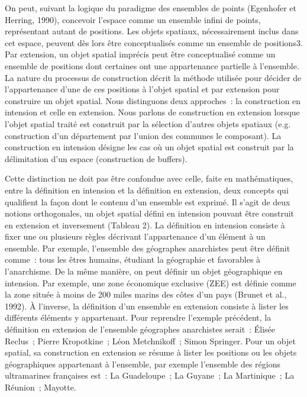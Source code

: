 On peut, suivant la logique du paradigme des ensembles de points
(Egenhofer et Herring, 1990), concevoir l’espace comme un ensemble
infini de points, représentant autant de positions. Les objets
spatiaux, nécessairement inclus dans cet espace, peuvent dès lors être
conceptualisés comme un ensemble de positions3. Par extension, un
objet spatial imprécis peut être conceptualisé comme un ensemble de
positions dont certaines ont une appartenance partielle à
l’ensemble. La nature du processus de construction décrit la méthode
utilisée pour décider de l’appartenance d’une de ces positions à
l’objet spatial et par extension pour construire un objet
spatial. Nous distinguons deux approches : la construction en
intension et celle en extension. Nous parlons de construction en
extension lorsque l’objet spatial traité est construit par la
sélection d’autres objets spatiaux (e.g. construction d’un département
par l’union des communes le composant). La construction en intension
désigne les cas où un objet spatial est construit par la délimitation
d’un espace (\eg construction de buffers).

Cette distinction ne doit pas être confondue avec celle, faite en
mathématiques, entre la définition en intension et la définition en
extension, deux concepts qui qualifient la façon dont le contenu d’un
ensemble est exprimé. Il s’agit de deux notions orthogonales, un objet
spatial défini en intension pouvant être construit en extension et
inversement (Tableau 2). La définition en intension consiste à fixer
une ou plusieurs règles décrivant l’appartenance d’un élément à un
ensemble. Par exemple, l’ensemble des géographes anarchistes peut être
définit comme : tous les êtres humains, étudiant la géographie et
favorables à l’anarchisme. De la même manière, on peut définir un
objet géographique en intension. Par exemple, une zone économique
exclusive (ZEE) est définie comme la zone située à moins de 200 miles
marins des côtes d’un pays (Brunet et al., 1992). À l’inverse, la
définition d’un ensemble en extension consiste à lister les différents
éléments y appartenant. Pour reprendre l’exemple précédent, la
définition en extension de l’ensemble géographes anarchistes serait :
Élisée Reclus ; Pierre Kropotkine ; Léon Metchnikoff ; Simon
Springer. Pour un objet spatial, sa construction en extension se
résume à lister les positions ou les objets géographiques appartenant
à l’ensemble, par exemple l’ensemble des régions ultramarines
françaises est : La Guadeloupe ; La Guyane ; La Martinique ; La
Réunion ; Mayotte.

